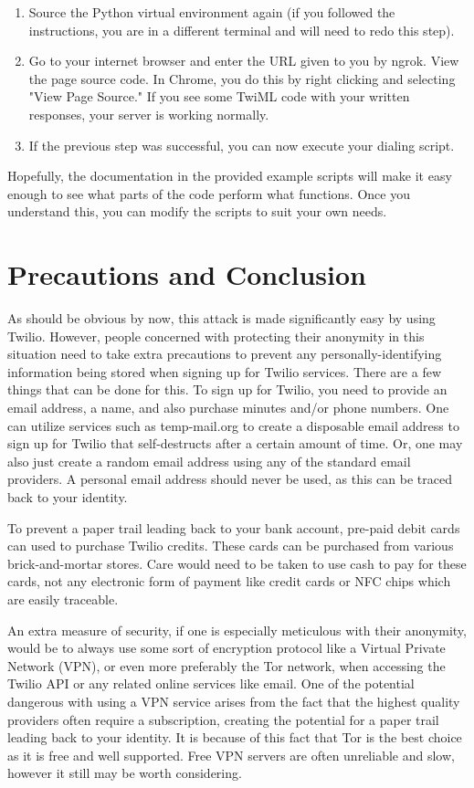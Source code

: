 \documentclass[10pt]{report}
\begin{document}
\begin{enumerate}
    \item Source the Python virtual environment again (if you followed the instructions, you are in a different terminal and will need to redo this step).
    
    \item Go to your internet browser and enter the URL given to you by ngrok. View the page source code. In Chrome, you do this by right clicking and selecting "View Page Source." If you see some TwiML code with your written responses, your server is working normally.
    
    \item If the previous step was successful, you can now execute your dialing script.
    
    
\end{enumerate}

Hopefully, the documentation in the provided example scripts will make it easy enough to see what parts of the code perform what functions. Once you understand this, you can modify the scripts to suit your own needs.

\chapter{Precautions and Conclusion}
As should be obvious by now, this attack is made significantly easy by using Twilio. However, people concerned with protecting their anonymity in this situation need to take extra precautions to prevent any personally-identifying information being stored when signing up for Twilio services. There are a few things that can be done for this. To sign up for Twilio, you need to provide an email address, a name, and also purchase minutes and/or phone numbers. One can utilize services such as temp-mail.org to create a disposable email address to sign up for Twilio that self-destructs after a certain amount of time. Or, one may also just create a random email address using any of the standard email providers. A personal email address should never be used, as this can be traced back to your identity.

To prevent a paper trail leading back to your bank account, pre-paid debit cards can used to purchase Twilio credits. These cards can be purchased from various brick-and-mortar stores. Care would need to be taken to use cash to pay for these cards, not any electronic form of payment like credit cards or NFC chips which are easily traceable.

An extra measure of security, if one is especially meticulous with their anonymity, would be to always use some sort of encryption protocol like a Virtual Private Network (VPN), or even more preferably the Tor network, when accessing the Twilio API or any related online services like email. One of the potential dangerous with using a VPN service arises from the fact that the highest quality providers often require a subscription, creating the potential for a paper trail leading back to your identity. It is because of this fact that Tor is the best choice as it is free and well supported. Free VPN servers are often unreliable and slow, however it still may be worth considering.
\end{document}
